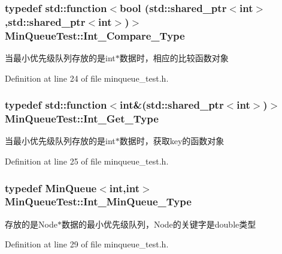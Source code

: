 \subsubsection[{Int\+\_\+\+Compare\+\_\+\+Type}]{\setlength{\rightskip}{0pt plus 5cm}typedef std\+::function$<$bool (std\+::shared\+\_\+ptr$<$int$>$,std\+::shared\+\_\+ptr$<$int$>$)$>$ {\bf Min\+Queue\+Test\+::\+Int\+\_\+\+Compare\+\_\+\+Type}}\label{class_min_queue_test_a627ceae9e25205d70955137bbfc863fd}
当最小优先级队列存放的是int$\ast$数据时，相应的比较函数对象 

Definition at line 24 of file minqueue\+\_\+test.\+h.

\hypertarget{class_min_queue_test_a40648c6c5c338387bda62519dc99fc79}{}
\subsubsection[{Int\+\_\+\+Get\+\_\+\+Type}]{\setlength{\rightskip}{0pt plus 5cm}typedef std\+::function$<$int\&(std\+::shared\+\_\+ptr$<$int$>$)$>$ {\bf Min\+Queue\+Test\+::\+Int\+\_\+\+Get\+\_\+\+Type}}\label{class_min_queue_test_a40648c6c5c338387bda62519dc99fc79}
当最小优先级队列存放的是int$\ast$数据时，获取key的函数对象 

Definition at line 25 of file minqueue\+\_\+test.\+h.

\hypertarget{class_min_queue_test_ad81df38acc845934accb320c4dbdd582}{}
\subsubsection[{Int\+\_\+\+Min\+Queue\+\_\+\+Type}]{\setlength{\rightskip}{0pt plus 5cm}typedef {\bf Min\+Queue}$<$int,int$>$ {\bf Min\+Queue\+Test\+::\+Int\+\_\+\+Min\+Queue\+\_\+\+Type}}\label{class_min_queue_test_ad81df38acc845934accb320c4dbdd582}
存放的是\+Node$\ast$数据的最小优先级队列，\+Node的关键字是double类型 

Definition at line 29 of file minqueue\+\_\+test.\+h.

\hypertarget{class_min_queue_test_a25bfd5b74968c587db57133f107a5f61}{}
